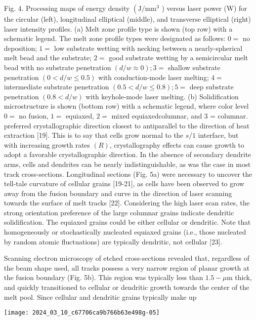 \documentclass[10pt]{article}
\begin{document}
Fig. 4. Processing maps of energy density $\left(\mathrm{J} / \mathrm{mm}^{3}\right.$ ) versus laser power (W) for the circular (left), longitudinal elliptical (middle), and transverse elliptical (right) laser intensity profiles. (a) Melt zone profile type is shown (top row) with a schematic legend. The melt zone profile types were designated as follows: $0=$ no deposition; $1=$ low substrate wetting with necking between a nearly-spherical melt bead and the substrate; $2=$ good substrate wetting by a semicircular melt bead with no substrate penetration $(d / w \approx 0) ; 3=$ shallow substrate penetration $(0<d / w \leq 0.5)$ with conduction-mode laser melting; $4=$ intermediate substrate penetration $(0.5<d / w \leq 0.8) ; 5=$ deep substrate penetration $(0.8<d / w)$ with keyhole-mode laser melting. (b) Solidification microstructure is shown (bottom row) with a schematic legend, where color level $0=$ no fusion, $1=$ equiaxed, $2=$ mixed equiaxedcolumnar, and 3 = columnar.\\
preferred crystallographic direction closest to antiparallel to the direction of heat extraction [19]. This is to say that cells grow normal to the $s / 1$ interface, but with increasing growth rates $(R)$, crystallography effects can cause growth to adopt a favorable crystallographic direction. In the absence of secondary dendrite arms, cells and dendrites can be nearly indistinguishable, as was the case in most track cross-sections. Longitudinal sections (Fig. 5a) were necessary to uncover the tell-tale curvature of cellular grains [19-21], as cells have been observed to grow away from the fusion boundary and curve in the direction of laser scanning towards the surface of melt tracks [22]. Considering the high laser scan rates, the strong orientation preference of the large columnar grains indicate dendritic solidification. The equiaxed grains could be either cellular or dendritic. Note that homogeneously or stochastically nucleated equiaxed grains (i.e., those nucleated by random atomic fluctuations) are typically dendritic, not cellular [23].

Scanning electron microscopy of etched cross-sections revealed that, regardless of the beam shape used, all tracks possess a very narrow region of planar growth at the fusion boundary (Fig. 5b). This region was typically less than $1.5-\mu \mathrm{m}$ thick, and quickly transitioned to cellular or dendritic growth towards the center of the melt pool. Since cellular and dendritic grains typically make up

\begin{center}
\texttt{[image: 2024\_03\_10\_c67706ca9b766b63e498g-05]}
\end{center}
\end{document}
